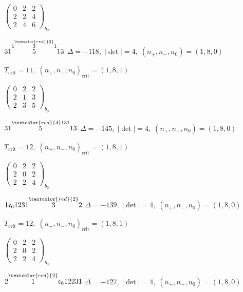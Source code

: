 \documentclass[10pt]{article}
\begin{document}
\hspace{2em}$\left(\begin{smallmatrix}0 & 2 & 2 \\ 2 & 2 & 4 \\ 2 & 4 & 6\end{smallmatrix}\right)_{\!b_0}$

$31\overset{1\overset{\textcolor{red}{2}}{3}1}{5}13$ \quad $\Delta=-118,\; |\det|=4,\; (n_+,n_-,n_0)=(1,8,0)$

\hspace{1em}$T_{\text{crit}}=11,\; (n_+,n_-,n_0)_{\text{crit}}=(1,8,1)$

\hspace{2em}$\left(\begin{smallmatrix}0 & 2 & 2 \\ 2 & 1 & 3 \\ 2 & 3 & 5\end{smallmatrix}\right)_{\!b_0}$

$31\overset{\textcolor{red}{4}131}{5}13$ \quad $\Delta=-145,\; |\det|=4,\; (n_+,n_-,n_0)=(1,8,0)$

\hspace{1em}$T_{\text{crit}}=12,\; (n_+,n_-,n_0)_{\text{crit}}=(1,8,1)$

\hspace{2em}$\left(\begin{smallmatrix}0 & 2 & 2 \\ 2 & 0 & 2 \\ 2 & 2 & 4\end{smallmatrix}\right)_{\!b_0}$

\smallskip

$1\mathfrak{e}_61231\overset{\textcolor{red}{2}}{3}2$ \quad $\Delta=-139,\; |\det|=4,\; (n_+,n_-,n_0)=(1,8,0)$

\hspace{1em}$T_{\text{crit}}=12,\; (n_+,n_-,n_0)_{\text{crit}}=(1,8,1)$

\hspace{2em}$\left(\begin{smallmatrix}0 & 2 & 2 \\ 2 & 0 & 2 \\ 2 & 2 & 4\end{smallmatrix}\right)_{\!b_0}$

\smallskip

$2\overset{\textcolor{red}{2}}{1}\mathfrak{e}_612231$ \quad $\Delta=-127,\; |\det|=4,\; (n_+,n_-,n_0)=(1,8,0)$
\end{document}
